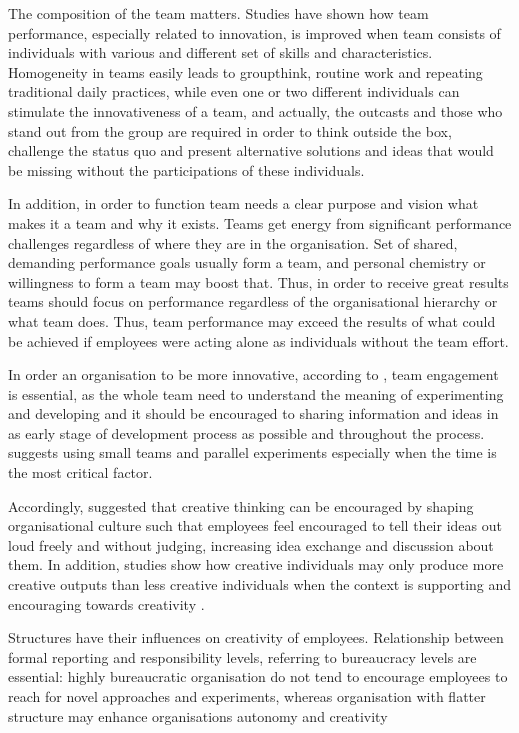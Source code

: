 The composition of the team matters. Studies have shown how team performance, especially related to innovation, is improved when team consists of individuals with various and different set of skills and characteristics\citep{buijs2007innovation}. Homogeneity in teams easily leads to groupthink, routine work and repeating traditional daily practices, while even one or two different individuals can stimulate the innovativeness of a team, and actually, the outcasts and those who stand out from the group are required in order to think outside the box, challenge the status quo and present alternative solutions and ideas that would be missing without the participations of these individuals. \citep{sternberg1997creativity}

In addition, in order to function team needs a clear purpose and vision what makes it a team and why it exists. Teams get energy from significant performance challenges regardless of where they are in the organisation. Set of shared, demanding performance goals usually form a team, and personal chemistry or willingness to form a team may boost that. Thus, in order to receive great results teams should focus on performance regardless of the organisational hierarchy or what team does. Thus, team performance may exceed the results of what could be achieved if employees were acting alone as individuals without the team effort. \citep{katzenbach1993wisdom}

In order an organisation to be more innovative, according to \citet{thomke2001enlightened}, team engagement is essential, as the whole team need to understand the meaning of experimenting and developing and it should be encouraged to sharing information and ideas in as early stage of development process as possible and throughout the process. \citet{thomke2001enlightened} suggests using small teams and parallel experiments especially when the time is the most critical factor. 

Accordingly, \citet{amabile1998kill} suggested that creative thinking can be encouraged by shaping organisational culture such that employees feel encouraged to tell their ideas out loud freely and without judging, increasing idea exchange and discussion about them. In addition, studies show how creative individuals may only produce more creative outputs than less creative individuals when the context is supporting and encouraging towards creativity \citep{oldham1996employee}. 

Structures have their influences on creativity of employees. Relationship between formal reporting and responsibility levels, referring to bureaucracy levels are essential: highly bureaucratic organisation do not tend to encourage employees to reach for novel approaches and experiments, whereas organisation with flatter structure may enhance organisations autonomy and creativity \citep{shalley2004leaders}

